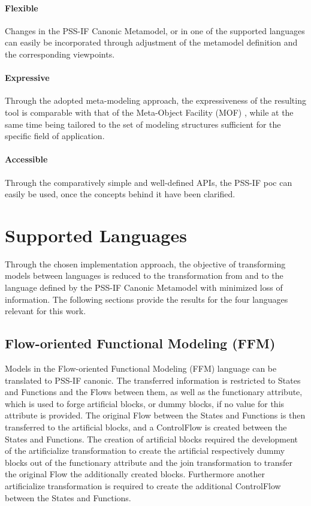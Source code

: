 \paragraph{Flexible} Changes in the PSS-IF Canonic Metamodel, or in one of the supported languages can easily be incorporated through adjustment of the metamodel definition and the corresponding viewpoints.

\paragraph{Expressive} Through the adopted meta-modeling approach, the expressiveness of the resulting tool is comparable with that of the Meta-Object Facility (MOF) \cite{ref:mof}, while at the same time being tailored to the set of modeling structures sufficient for the specific field of application.

\paragraph{Accessible} Through the comparatively simple and well-defined APIs, the PSS-IF \gls{poc} can easily be used, once the concepts behind it have been clarified.

\section{Supported Languages}
\label{sec:results:languages}

Through the chosen implementation approach, the objective of transforming models between languages is reduced to the transformation from and to the language defined by the PSS-IF Canonic Metamodel with minimized loss of information. The following sections provide the results for the four languages relevant for this work.

\subsection{Flow-oriented Functional Modeling (FFM)}

Models in the Flow-oriented Functional Modeling (FFM) language can be translated to PSS-IF canonic. The transferred information is restricted to States and Functions and the Flows between them, as well as the functionary attribute, which is used to forge artificial blocks, or dummy blocks, if no value for this attribute is provided. The original Flow between the States and Functions is then transferred to the artificial blocks, and a ControlFlow is created between the States and Functions. The creation of artificial blocks required the development of the artificialize transformation to create the artificial respectively dummy blocks out of the functionary attribute and the join transformation to transfer the original Flow the additionally created blocks. Furthermore another artificialize transformation is required to create the additional ControlFlow between the States and Functions.

